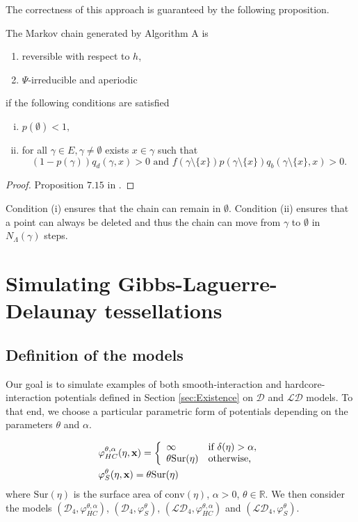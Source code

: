 \noindent The correctness of this approach is guaranteed by the following proposition.

\begin{proposition}
The Markov chain generated by Algorithm A is
\begin{enumerate}
\item reversible with respect to $h$,
\item $\Psi$-irreducible and aperiodic 
\end{enumerate}
if  the following conditions are satisfied
\begin{enumerate}[(i)]
	\item $p(\emptyset)<1,$
	\item for all $\gamma \in E, \gamma\neq \emptyset$ exists $x \in \gamma$ such that
	$$(1-p(\gamma))q_d(\gamma,x)>0 \text{ and } f(\gamma\setminus \{x\})p(\gamma \setminus \{x\}) q_b(\gamma\setminus \{x\},x)>0.$$ 
\end{enumerate}
\end{proposition}
\begin{proof}
Proposition $7.15$ in \cite{MollerWaagepetersen2003}.
\end{proof}

Condition (i) ensures that the chain can remain in $\emptyset$. Condition (ii) ensures that a point can always be deleted and thus the chain can move from $\gamma$ to $\emptyset$ in $N_\Lambda(\gamma)$ steps.



\section{Simulating Gibbs-Laguerre-Delaunay tessellations}
\subsection{Definition of the models}
Our goal is to simulate examples of both smooth-interaction and hardcore-interaction potentials defined in Section \ref{sec:Existence} on $\mathcal D$ and $\mathcal {LD}$ models. To that end, we choose a particular parametric form of potentials depending on the parameters $\theta$ and $\alpha$.

\begin{align}\label{modelHC}
&\varphi^{\theta,\alpha}_{HC}(\eta,{\mathbf{x}}) = 
\left\{
    \begin{array}{ll}
        \infty & \mbox{if } \delta(\eta)> \alpha, \\
        \theta \mathrm{Sur}(\eta) & \mbox{otherwise, }
    \end{array}
\right. \\
&\varphi^{\theta}_{S}(\eta,{\mathbf{x}}) =  \theta \mathrm{Sur}(\eta) 
\end{align}
where $\mathrm{Sur}(\eta)$ is the surface area of $\mathrm{conv}(\eta)$, $\alpha>0$, $\theta \in \mathbb R$. We then consider the models $(\mathcal D_4,\varphi^{\theta,\alpha}_{HC})$, $(\mathcal D_4,\varphi^{\theta}_{S})$, $(\mathcal {LD}_4,\varphi^{\theta,\alpha}_{HC})$ and $(\mathcal {LD}_4,\varphi^{\theta}_{S})$.



